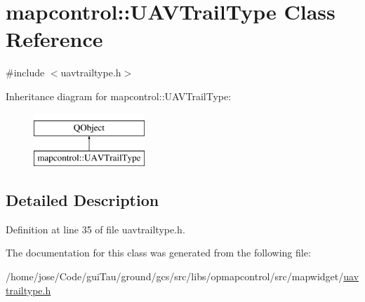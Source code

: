 \hypertarget{classmapcontrol_1_1_u_a_v_trail_type}{\section{mapcontrol\-:\-:U\-A\-V\-Trail\-Type Class Reference}
\label{classmapcontrol_1_1_u_a_v_trail_type}
}


{\ttfamily \#include $<$uavtrailtype.\-h$>$}

Inheritance diagram for mapcontrol\-:\-:U\-A\-V\-Trail\-Type\-:\begin{figure}[H]
\begin{center}
\leavevmode
\includegraphics[height=2.000000cm]{classmapcontrol_1_1_u_a_v_trail_type}
\end{center}
\end{figure}


\subsection{Detailed Description}


Definition at line 35 of file uavtrailtype.\-h.



The documentation for this class was generated from the following file\-:\begin{DoxyCompactItemize}
\item 
/home/jose/\-Code/gui\-Tau/ground/gcs/src/libs/opmapcontrol/src/mapwidget/\hyperlink{uavtrailtype_8h}{uavtrailtype.\-h}\end{DoxyCompactItemize}
